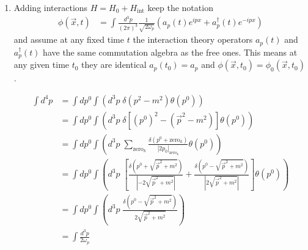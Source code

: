 \documentclass[10pt,a4paper]{book}
\theoremstyle{definition}
\begin{document}
\begin{enumerate}
\item Adding interactions $H=H_0+H_\text{int}$ keep the notation
\begin{align}
\phi(\vec{x},t)
&=\int\frac{d^3p}{(2\pi)^3}\frac{1}{\sqrt{2\omega_p}}\left(a_p(t)e^{ipx}+a_p^\dagger(t) e^{-ipx}\right)
\end{align}
and assume at any fixed time $t$ the interaction theory operators $a_p(t)$ and $a_p^\dagger(t)$ have the same commutation algebra as the free ones. This means at any given time $t_0$ they are identical $a_p(t_0)=a_p$ and $\phi(\vec{x},t_0)=\phi_0(\vec{x},t_0)$.



\begin{align}
\int d^4p 
&= \int dp^0 \int\left(d^3p\;\delta(p^2-m^2)\theta(p^0)\right)\\
&= \int dp^0 \int\left(d^3p\;\delta[(p^0)^2-(\vec{p}^2-m^2)]\theta(p^0)\right)\\
&= \int dp^0 \int\left(d^3p\;   \sum_{\text{zero}_k}\frac{\delta(p^0+\text{zero}_k)}{|2p_0|_{\text{zero}_k}}      \theta(p^0)\right)\\
&= \int dp^0 \int\left(d^3p\;\left[  \frac{\delta(p^0+\sqrt{\vec{p}^2+m^2})}{|-2\sqrt{\vec{p}^2+m^2}|}+\frac{\delta(p^0-\sqrt{\vec{p}^2+m^2})}{|2\sqrt{\vec{p}^2+m^2}|}    \right]  \theta(p^0)\right)\\
&= \int dp^0 \int\left(d^3p\;\frac{\delta(p^0-\sqrt{\vec{p}^2+m^2})}{2\sqrt{\vec{p}^2+m^2}}  \right)\\
&= \int \frac{d^3p}{2\omega_p}
\end{align}

\end{enumerate}





\newpage
\end{document}
